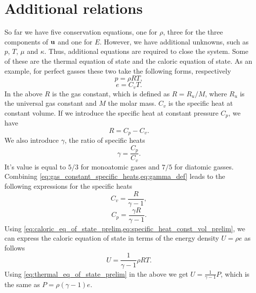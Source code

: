 \documentclass[oneside,a4paper,11pt]{report}
\begin{document}
\section{Additional relations}
So far we have five conservation equations, one for $\rho$, three for the three components of $\mathbf{u}$ and one for $E$. However, we have additional unknowns, such as $p$, $T$, $\mu$ and $\kappa$. Thus, additional equations are required to close the system. Some of these are the thermal equation of state and the caloric equation of state. As an example, for perfect gasses these two take the following forms, respectively
\begin{equation}
\label{eq:thermal_eq_of_state_prelim}
    p = \rho R T,
\end{equation}
\begin{equation}
\label{eq:caloric_eq_of_state_prelim}
    e = C_v T.
\end{equation}
In the above $R$ is the gas constant, which is defined as $R = R_u / M$, where $R_u$ is the universal gas constant and $M$ the molar mass. $C_v$ is the specific heat at constant volume. If we introduce the specific heat at constant pressure $C_p$, we have 
\begin{equation}
\label{eq:gas_constant_specific_heats}
    R = C_p - C_v.
\end{equation}
We also introduce $\gamma$, the ratio of specific heats
\begin{equation}
\label{eq:gamma_def}
    \gamma = \frac{C_p}{C_v}.
\end{equation}
It's value is equal to $5/3$ for monoatomic gases and $7/5$ for diatomic gasses. Combining \cref{eq:gas_constant_specific_heats,eq:gamma_def} leads to the following expressions for the specific heats 
\begin{equation}
\label{eq:specific_heat_const_vol_prelim}
    C_v = \frac{R}{\gamma - 1},
\end{equation}
\begin{equation}
    \label{eq:specific_heat_const_press_prelim}
    C_p = \frac{\gamma R}{\gamma - 1}.
\end{equation}
Using \cref{eq:caloric_eq_of_state_prelim,eq:specific_heat_const_vol_prelim}, we can express the caloric equation of state in terms of the energy density $U = \rho e$ as follows
\begin{equation}
    U = \frac{1}{\gamma - 1} \rho R T.
\end{equation}
Using \cref{eq:thermal_eq_of_state_prelim} in the above we get $U = \frac{1}{\gamma - 1} P$, which is the same as $P = \rho (\gamma -1) e$.
\end{document}
